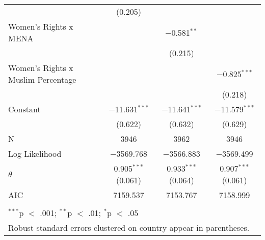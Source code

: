 \begin{table}[!htbp]
\begin{tabular}{@{\extracolsep{5pt}}lccc}
  & (0.205) &  &  \\ 
  Women's Rights x MENA &  & $-$0.581$^{**}$ &  \\ 
  &  & (0.215) &  \\ 
  Women's Rights x Muslim Percentage &  &  & $-$0.825$^{***}$ \\ 
  &  &  & (0.218) \\ 
  Constant & $-$11.631$^{***}$ & $-$11.641$^{***}$ & $-$11.579$^{***}$ \\ 
  & (0.622) & (0.632) & (0.629) \\ 
 N & 3946 & 3962 & 3946 \\ 
Log Likelihood & $-$3569.768 & $-$3566.883 & $-$3569.499 \\ 
$\theta$ & 0.905$^{***}$  (0.061) & 0.933$^{***}$  (0.064) & 0.907$^{***}$  (0.061) \\ 
AIC & 7159.537 & 7153.767 & 7158.999 \\ 
\hline \\[-1.8ex] 
\multicolumn{4}{l}{$^{***}$p $<$ .001; $^{**}$p $<$ .01; $^{*}$p $<$ .05} \\ 
\multicolumn{4}{l}{Robust standard errors clustered on country appear in parentheses.} \\ 
\end{tabular} 
\end{table} 
